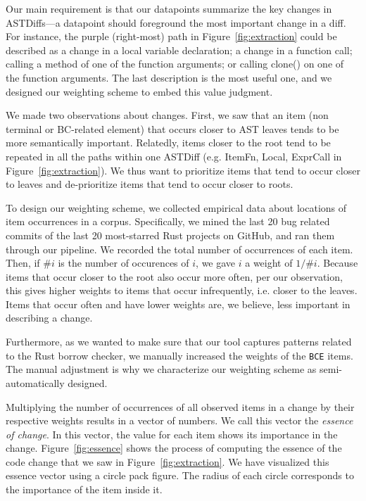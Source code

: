 Our main requirement is that our datapoints summarize the key changes in ASTDiffs---a datapoint should foreground the most important change in a diff. For instance, the purple (right-most) path in Figure~\ref{fig:extraction} could be described as a change in a local variable declaration; a change in a function call; calling a method of one of the function arguments; or calling clone() on one of the function arguments. The last description is the most useful one, and we designed our weighting scheme to embed this value judgment.

We made two observations about changes. First, we saw that an item (non terminal or BC-related element) that occurs closer to AST leaves tends to be more semantically important. Relatedly, items closer to the root tend to be repeated in all the paths within one ASTDiff (e.g. ItemFn, Local, ExprCall in Figure~\ref{fig:extraction}). We thus want to prioritize items that tend to occur closer to leaves and de-prioritize items that tend to occur closer to roots.

To design our weighting scheme, we collected empirical data about locations of item occurrences in a corpus. Specifically, we mined the last 20 bug related commits of the last 20 most-starred Rust projects on GitHub, and ran them through our pipeline. We recorded the total number of occurrences of each item. Then, if $\# i$ is the number of occurences of $i$, we gave $i$ a weight of $1/\# i$. Because items that occur closer to the root also occur more often, per our observation, this gives higher weights to items that occur infrequently, i.e. closer to the leaves. Items that occur often and have lower weights are, we believe, less important in describing a change.

Furthermore, as we wanted to make sure that our tool captures patterns related to the Rust borrow checker, we manually increased the weights of the \texttt{BCE} items. The manual adjustment is why we characterize our weighting scheme as semi-automatically designed. 

Multiplying the number of occurrences of all observed items in a change by their respective weights results in a vector of numbers. We call this vector the \emph{essence of change}. In this vector, the value for each item shows its importance in the change. Figure~\ref{fig:essence} shows the process of computing the essence of the code change that we saw in Figure~\ref{fig:extraction}. We have visualized this essence vector using a circle pack figure. The radius of each circle corresponds to the importance of the item inside it.


